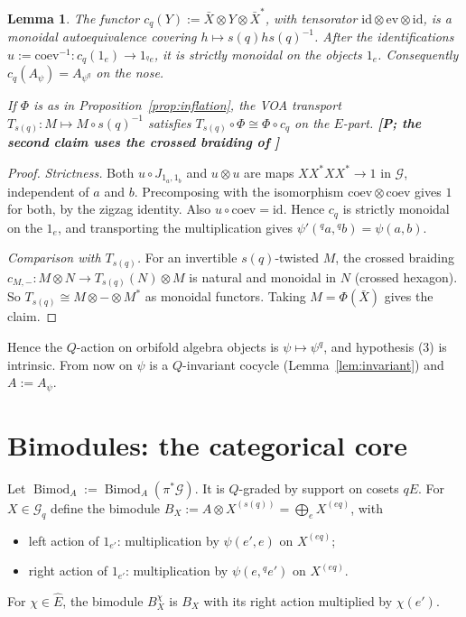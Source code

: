 \documentclass[11pt]{article}
\newtheorem{lemma}[theorem]{Lemma}
\theoremstyle{definition}
\newcommand{\cG}{\mathcal G}
\newcommand{\Bimod}{\operatorname{Bimod}}
\newcommand{\Ehat}{\widehat E}
\newcommand{\st}[1]{\textbf{[#1]}}
\begin{document}
\begin{lemma}\label{lem:conj}
The functor $c_q(Y):=\bar X\otimes Y\otimes\bar X^*$, with tensorator $\mathrm{id}\otimes
\mathrm{ev}\otimes\mathrm{id}$, is a monoidal autoequivalence covering $h\mapsto s(q)hs(q)^{-1}$.
After the identifications $u:=\mathrm{coev}^{-1}:c_q(1_e)\to1_{{}^qe}$, it is \emph{strictly}
monoidal on the objects $1_e$. Consequently $c_q(A_\psi)=A_{\psi^q}$ on the nose.

If $\Phi$ is as in Proposition~\ref{prop:inflation}, the VOA transport
$T_{s(q)}:M\mapsto M\circ s(q)^{-1}$ satisfies $T_{s(q)}\circ\Phi\cong\Phi\circ c_q$ on the
$E$-part. \st{P; the second claim uses the crossed braiding of \cite[Thms 2.10, 4.15]{McR}}
\end{lemma}
\begin{proof}
\emph{Strictness.} Both $u\circ J_{1_a,1_b}$ and $u\otimes u$ are maps $X X^*XX^*\to1$ in $\cG$,
independent of $a$ and $b$. Precomposing with the isomorphism $\mathrm{coev}\otimes\mathrm{coev}$
gives $1$ for both, by the zigzag identity. Also $u\circ\mathrm{coev}=\mathrm{id}$. Hence $c_q$
is strictly monoidal on the $1_e$, and transporting the multiplication gives
$\psi'({}^qa,{}^qb)=\psi(a,b)$.

\emph{Comparison with $T_{s(q)}$.} For an invertible $s(q)$-twisted $M$, the crossed braiding
$c_{M,-}:M\otimes N\to T_{s(q)}(N)\otimes M$ is natural and monoidal in $N$ (crossed hexagon).
So $T_{s(q)}\cong M\otimes-\otimes M^*$ as monoidal functors. Taking $M=\Phi(\bar X)$ gives the
claim.
\end{proof}
Hence the $Q$-action on orbifold algebra objects is $\psi\mapsto\psi^q$, and hypothesis (3) is
intrinsic. From now on $\psi$ is a $Q$-invariant cocycle (Lemma~\ref{lem:invariant}) and
$A:=A_\psi$.

\section{Bimodules: the categorical core}\label{sec:bimod}
Let $\Bimod_A:=\Bimod_A(\pi^*\cG)$. It is $Q$-graded by support on cosets $qE$. For $X\in\cG_q$
define the bimodule $B_X:=A\otimes X^{(s(q))}=\bigoplus_eX^{(eq)}$, with
\begin{itemize}[nosep]
\item left action of $1_{e'}$: multiplication by $\psi(e',e)$ on $X^{(eq)}$;
\item right action of $1_{e'}$: multiplication by $\psi(e,{}^qe')$ on $X^{(eq)}$.
\end{itemize}
For $\chi\in\Ehat$, the bimodule $B_X^\chi$ is $B_X$ with its right action multiplied by
$\chi(e')$.
\end{document}
